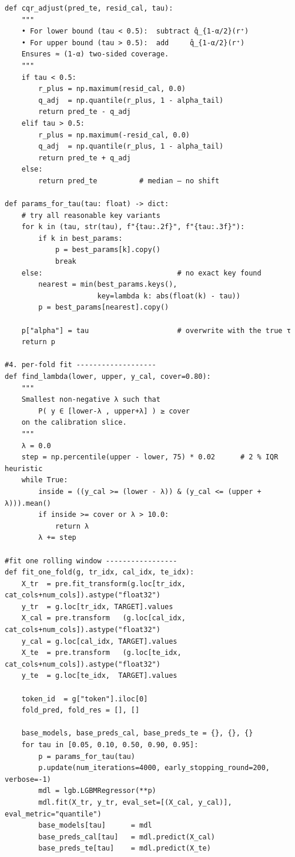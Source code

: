 \documentclass[
  a4paper,
  DIV=11,
  numbers=noendperiod]{scrreprt}
\begin{document}
\begin{verbatim}
def cqr_adjust(pred_te, resid_cal, tau):
    """
    • For lower bound (tau < 0.5):  subtract q̂_{1-α/2}(r⁺)
    • For upper bound (tau > 0.5):  add     q̂_{1-α/2}(r⁺)
    Ensures ≈ (1-α) two-sided coverage.
    """
    if tau < 0.5:
        r_plus = np.maximum(resid_cal, 0.0)
        q_adj  = np.quantile(r_plus, 1 - alpha_tail)
        return pred_te - q_adj
    elif tau > 0.5:
        r_plus = np.maximum(-resid_cal, 0.0)
        q_adj  = np.quantile(r_plus, 1 - alpha_tail)
        return pred_te + q_adj
    else:
        return pred_te          # median – no shift

def params_for_tau(tau: float) -> dict:
    # try all reasonable key variants
    for k in (tau, str(tau), f"{tau:.2f}", f"{tau:.3f}"):
        if k in best_params:
            p = best_params[k].copy()
            break
    else:                                # no exact key found
        nearest = min(best_params.keys(),
                      key=lambda k: abs(float(k) - tau))
        p = best_params[nearest].copy()

    p["alpha"] = tau                     # overwrite with the true τ
    return p

#4. per-fold fit -------------------
def find_lambda(lower, upper, y_cal, cover=0.80):
    """
    Smallest non-negative λ such that
        P( y ∈ [lower-λ , upper+λ] ) ≥ cover
    on the calibration slice.
    """
    λ = 0.0
    step = np.percentile(upper - lower, 75) * 0.02      # 2 % IQR heuristic
    while True:
        inside = ((y_cal >= (lower - λ)) & (y_cal <= (upper + λ))).mean()
        if inside >= cover or λ > 10.0:
            return λ
        λ += step

#fit one rolling window -----------------
def fit_one_fold(g, tr_idx, cal_idx, te_idx):
    X_tr  = pre.fit_transform(g.loc[tr_idx, cat_cols+num_cols]).astype("float32")
    y_tr  = g.loc[tr_idx, TARGET].values
    X_cal = pre.transform   (g.loc[cal_idx, cat_cols+num_cols]).astype("float32")
    y_cal = g.loc[cal_idx, TARGET].values
    X_te  = pre.transform   (g.loc[te_idx,  cat_cols+num_cols]).astype("float32")
    y_te  = g.loc[te_idx,  TARGET].values

    token_id  = g["token"].iloc[0]
    fold_pred, fold_res = [], []

    base_models, base_preds_cal, base_preds_te = {}, {}, {}
    for tau in [0.05, 0.10, 0.50, 0.90, 0.95]:
        p = params_for_tau(tau)
        p.update(num_iterations=4000, early_stopping_round=200, verbose=-1)
        mdl = lgb.LGBMRegressor(**p)
        mdl.fit(X_tr, y_tr, eval_set=[(X_cal, y_cal)], eval_metric="quantile")
        base_models[tau]      = mdl
        base_preds_cal[tau]   = mdl.predict(X_cal)
        base_preds_te[tau]    = mdl.predict(X_te)


\end{verbatim}
\end{document}
